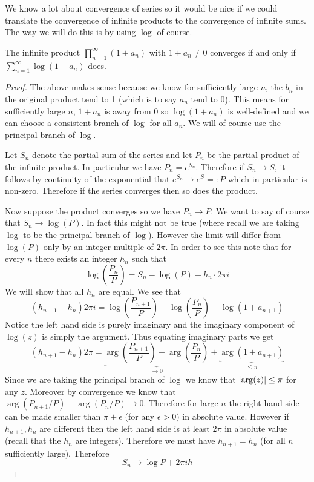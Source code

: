 We know a lot about convergence of series so it would be nice if we could translate the convergence of infinite products to the convergence of infinite sums. The way we will do this is by using $\log$ of course. 
\begin{theorem}
    The infinite product $\prod_{n = 1}^\infty (1 + a_n)$ with $1 + a_n \neq 0$ converges if and only if $\sum_{n = 1}^\infty \log(1 + a_n)$ does. 
\end{theorem}
\begin{proof}
    The above makes sense because we know for sufficiently large $n$, the $b_n$ in the original product tend to 1 (which is to say $a_n$ tend to 0). This means for sufficiently large $n$, $1 + a_n$ is away from 0 so $\log(1 + a_n)$ is well-defined and we can choose a consistent branch of $\log$ for all $a_n$. We will of course use the principal branch of $\log$. 

    Let $S_n$ denote the partial sum of the series and let $P_n$ be the partial product of the infinite product. In particular we have $P_n = e^{S_n}$. Therefore if $S_n \to S$, it follows by continuity of the exponential that $e^{S_n} \to e^S =: P$ which in particular is non-zero. Therefore if the series converges then so does the product.

    Now suppose the product converges so we have $P_n \to P$. We want to say of course that $S_n \to \log(P)$. In fact this might not be true (where recall we are taking $\log$ to be the principal branch of $\log$). However the limit will differ from $\log(P)$ only by an integer multiple of $2\pi$. In order to see this note that for every $n$ there exists an integer $h_n$ such that
    $$\log \left( \frac{P_n}{P} \right) = S_n - \log(P) + h_n \cdot 2\pi i$$
    We will show that all $h_n$ are equal. We see that 
    $$(h_{n + 1} - h_n)2\pi i = \log \left( \frac{P_{n + 1}}{P} \right) - \log \left( \frac{P_n}{P} \right) + \log(1 + a_{n + 1})$$
    Notice the left hand side is purely imaginary and the imaginary component of $\log(z)$ is simply the argument. Thus equating imaginary parts we get 
    $$(h_{n + 1} - h_n)2\pi = \underbrace{\arg \left( \frac{P_{n + 1}}{P} \right) - \arg \left( \frac{P_n}{P} \right)}_{\to 0} + \underbrace{\arg(1 + a_{n + 1})}_{\leq \pi}$$
    Since we are taking the principal branch of $\log$ we know that $\left|\arg(z)\right| \leq \pi$ for any $z$. Moreover by convergence we know that $\arg(P_{n+1}/P) - \arg(P_n/P) \to 0$. Therefore for large $n$ the right hand side can be made smaller than $\pi + \epsilon$ (for any $\epsilon > 0$) in absolute value. However if $h_{n + 1}, h_n$ are different then the left hand side is at least $2\pi$ in absolute value (recall that the $h_n$ are integers). Therefore we must have $h_{n + 1} = h_n$ (for all $n$ sufficiently large). Therefore
    $$S_n \to \log P + 2\pi i h$$
\end{proof}

